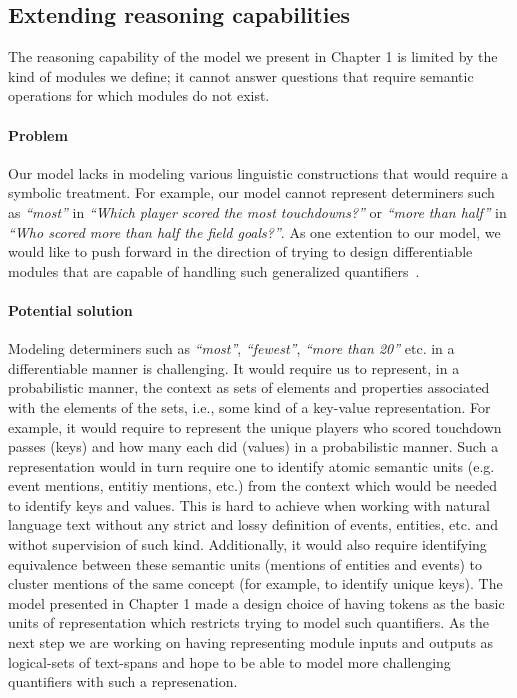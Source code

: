 \documentclass[main.tex]{subfiles}
\begin{document}
\subsection{Extending reasoning capabilities}
The reasoning capability of the model we present in Chapter 1 is limited by the kind of modules we define; it cannot answer questions that require semantic operations for which modules do not exist.  %

\paragraph{Problem}
Our model lacks in modeling various linguistic constructions that would require a symbolic treatment. For example, our model cannot represent determiners such as \textit{``most''} in \textit{``Which player scored the most touchdowns?''} or \textit{``more than half''} in \textit{``Who scored more than half the field goals?''}.
As one extention to our model, we would like to push forward in the direction of trying to design differentiable modules that are capable of handling such generalized quantifiers~\cite{gq-mostowski-1957}.

\paragraph{Potential solution}
Modeling determiners such as \textit{``most''}, \textit{``fewest''}, \textit{``more than 20''} etc. in a differentiable manner is challenging.  It would require us to represent, in a probabilistic manner, the context as sets of elements and properties associated with the elements of the sets, i.e., some kind of a key-value representation.  For example, it would require to represent the unique players who scored touchdown passes (keys) and how many each did (values) in a probabilistic manner.
Such a representation would in turn require one to identify atomic semantic units (e.g. event mentions, entitiy mentions, etc.) from the context which would be needed to identify keys and values.  This is hard to achieve when working with natural language text without any strict and lossy definition of events, entities, etc. and withot supervision of such kind.
Additionally, it would also require identifying equivalence between these semantic units (mentions of entities and events) to cluster mentions of the same concept (for example, to identify unique keys).
The model presented in Chapter 1 made a design choice of having tokens as the basic units of representation which restricts trying to model such quantifiers.  As the next step we are working on having representing module inputs and outputs as logical-sets of text-spans and hope to be able to model more challenging quantifiers with such a represenation.
\end{document}
